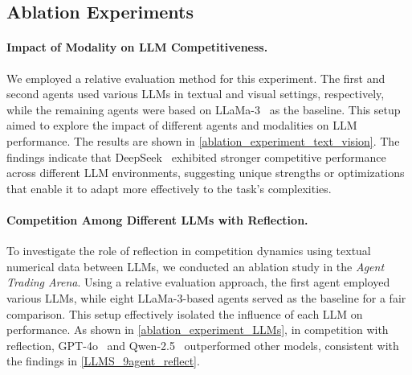 \subsection{Ablation Experiments}


\paragraph{Impact of Modality on LLM Competitiveness.} 

We employed a relative evaluation method for this experiment. The first and second agents used various LLMs in textual and visual settings, respectively, while the remaining agents were based on LLaMa-3~\citep{LLaMa3} as the baseline. This setup aimed to explore the impact of different agents and modalities on LLM performance. The results are shown in \autoref{ablation_experiment_text_vision}. The findings indicate that DeepSeek~\citep{DeepSeek3v} exhibited stronger competitive performance across different LLM environments, suggesting unique strengths or optimizations that enable it to adapt more effectively to the task's complexities.

\vspace{-3pt}

\paragraph{Competition Among Different LLMs with Reflection.} 


To investigate the role of reflection in competition dynamics using textual numerical data between LLMs, we conducted an ablation study in the \textit{Agent Trading Arena}. Using a relative evaluation approach, the first agent employed various LLMs, while eight LLaMa-3-based agents served as the baseline for a fair comparison. This setup effectively isolated the influence of each LLM on performance. As shown in \autoref{ablation_experiment_LLMs}, in competition with reflection, GPT-4o~\citep{GPT4o} and Qwen-2.5~\citep{qwen2.5} outperformed other models, consistent with the findings in \autoref{LLMS_9agent_reflect}.


